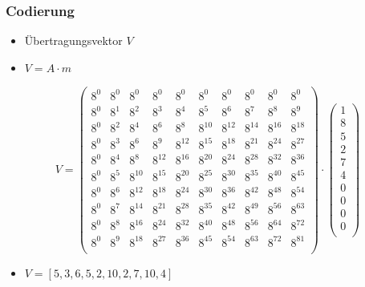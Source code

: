 \documentclass[11pt,aspectratio=169]{beamer}
\begin{document}
	\begin{frame}
		\frametitle{Codierung}
		
		\begin{itemize}
			\item Übertragungsvektor $V$
			
			\item $V = A \cdot m$
			
		\end{itemize}
		
		\[
		V = \begin{pmatrix}
			8^0&    8^0&    8^0&    8^0&    8^0&    8^0&    8^0&    8^0&    8^0&    8^0\\
			8^0&	8^1&	8^2&	8^3&	8^4&	8^5&	8^6&	8^7&    8^8&	8^9\\
			8^0&	8^2&	8^4&	8^6&	8^8& 8^{10}& 8^{12}& 8^{14}& 8^{16}& 8^{18}\\
			8^0&	8^3&	8^6&	8^9& 8^{12}& 8^{15}& 8^{18}& 8^{21}& 8^{24}& 8^{27}\\
			8^0&	8^4&	8^8& 8^{12}& 8^{16}& 8^{20}& 8^{24}& 8^{28}& 8^{32}& 8^{36}\\
			8^0&	8^5& 8^{10}& 8^{15}& 8^{20}& 8^{25}& 8^{30}& 8^{35}& 8^{40}& 8^{45}\\
			8^0&	8^6& 8^{12}& 8^{18}& 8^{24}& 8^{30}& 8^{36}& 8^{42}& 8^{48}& 8^{54}\\
			8^0&	8^7& 8^{14}& 8^{21}& 8^{28}& 8^{35}& 8^{42}& 8^{49}& 8^{56}& 8^{63}\\
			8^0&	8^8& 8^{16}& 8^{24}& 8^{32}& 8^{40}& 8^{48}& 8^{56}& 8^{64}& 8^{72}\\
			8^0&	8^9& 8^{18}& 8^{27}& 8^{36}& 8^{45}& 8^{54}& 8^{63}& 8^{72}& 8^{81}\\
		\end{pmatrix}
		\cdot
		\begin{pmatrix}
			1 \\ 8 \\ 5 \\ 2 \\ 7 \\ 4 \\ 0 \\ 0 \\ 0 \\ 0 \\
		\end{pmatrix}
		\]
		
		\begin{itemize}
			\item $V = [5,3,6,5,2,10,2,7,10,4]$
		\end{itemize}
			
	\end{frame}
\end{document}
